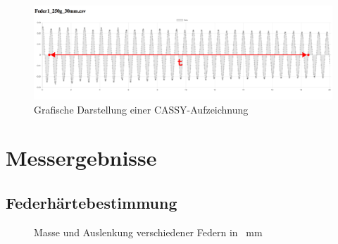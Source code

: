 \begin{figure}[H]
\centering
\includegraphics[width=\textwidth]{img/chartsel.png}
\caption{Grafische Darstellung einer CASSY-Aufzeichnung}
\end{figure}

\section{Messergebnisse}
\subsection{Federhärtebestimmung}
\label{sub:hardness}
\begin{figure}[H]
\centering
{}
\caption{Masse und Auslenkung verschiedener Federn in \SI{}{\milli\meter}}
\end{figure}

